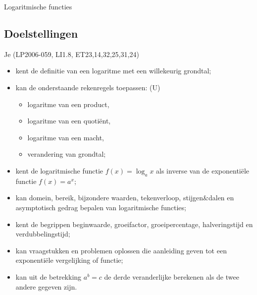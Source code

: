 \documentclass[12pt,twoside]{article}
\begin{document}
\thispagestyle{empty}
\begin{center}
  \begin{mdframed}
  \centering
  \fontsize{40}{60}\selectfont Logaritmische functies
  \end{mdframed}
  \vfill
  \vfill
\end{center}

\subsection*{Doelstellingen}
\vspace*{-0.8cm}
{\singlespacing
Je \hfill  {\scriptsize(LP2006-059, LI1.8, ET23,14,32,25,31,24)}
\begin{itemize}
  \itemsep-0.2em
  \item kent de definitie van een logaritme met een willekeurig grondtal;
  \item kan de onderstaande rekenregels toepassen: (U)
  \begin{itemize}
    \item logaritme van een product,
    \item logaritme van een quotiënt,
    \item logaritme van een macht,
    \item verandering van grondtal;
  \end{itemize}
  \item kent de logaritmische functie $f( x ) = \log_a x$ als inverse van de exponentiële functie $f( x ) = a^x$;
  \item kan domein, bereik, bijzondere waarden, tekenverloop, stijgen\&dalen en asymptotisch gedrag bepalen van logaritmische functies;
  \item kent de begrippen beginwaarde, groeifactor, groeipercentage, halveringstijd en verdubbelingstijd;
  \item kan vraagstukken en problemen oplossen die aanleiding geven tot een exponentiële vergelijking of functie;
  \item kan uit de betrekking $a^b = c$ de derde veranderlijke berekenen als de twee andere gegeven zijn.
\end{itemize}}
\end{document}
